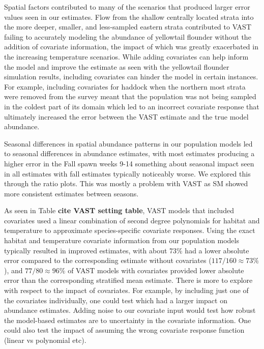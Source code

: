 \documentclass[
  12pt,
]{article}
\begin{document}
Spatial factors contributed to many of the scenarios that produced larger error values seen in our estimates. Flow from the shallow centrally located strata into the more deeper, smaller, and less-sampled eastern strata contributed to VAST failing to accurately modeling the abundance of yellowtail flounder without the addition of covariate information, the impact of which was greatly exacerbated in the increasing temperature scenarios. While adding covariates can help inform the model and improve the estimate as seen with the yellowtail flounder simulation results, including covariates can hinder the model in certain instances. For example, including covariates for haddock when the northern most strata were removed from the survey meant that the population was not being sampled in the coldest part of its domain which led to an incorrect covariate response that ultimately increased the error between the VAST estimate and the true model abundance.

Seasonal differences in spatial abundance patterns in our population models led to seasonal differences in abundance estimates, with most estimates producing a higher error in the Fall
spawn weeks 9-14
something about seasonal impact seen in all estimates with fall estimates typically noticeably worse. We explored this through the ratio plots. This was mostly a problem with VAST as SM showed more consistent estimates between seasons.

As seen in Table \textbf{cite VAST setting table}, VAST models that included covariates used a linear combination of second degree polynomials for habitat and temperature to approximate species-specific covariate responses. Using the exact habitat and temperature covariate information from our population models typically resulted in improved estimates, with about 73\% had a lower absolute error compared to the corresponding estimate without covariates (\(117/160\approx 73\%\)), and \(77/80\approx 96\%\) of VAST models with covariates provided lower absolute error than the corresponding stratified mean estimate. There is more to explore with respect to the impact of covariates. For example, by including just one of the covariates individually, one could test which had a larger impact on abundance estimates. Adding noise to our covariate input would test how robust the model-based estimates are to uncertainty in the covariate information. One could also test the impact of assuming the wrong covariate response function (linear vs polynomial etc).
\end{document}
